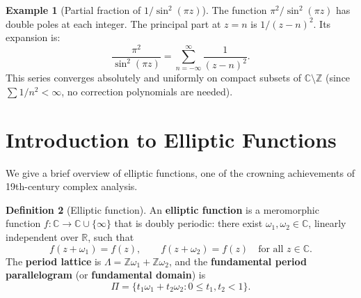 \documentclass[12pt,a4paper,openany]{book}
\theoremstyle{definition}
\newtheorem{definition}{Definition}[chapter]
\newtheorem{example}[definition]{Example}
\theoremstyle{plain}
\theoremstyle{remark}
\newcommand{\C}{\mathbb{C}}
\newcommand{\R}{\mathbb{R}}
\newcommand{\Z}{\mathbb{Z}}
\begin{document}
\begin{example}[Partial fraction of $1/\sin^2(\pi z)$]\label{ex:csc2-partial}
The function $\pi^2/\sin^2(\pi z)$ has double poles at each integer.
The principal part at $z = n$ is $1/(z-n)^2$. Its expansion is:
\[
  \frac{\pi^2}{\sin^2(\pi z)} = \sum_{n=-\infty}^{\infty} \frac{1}{(z-n)^2}.
\]
This series converges absolutely and uniformly on compact subsets
of $\C \setminus \Z$ (since $\sum 1/n^2 < \infty$, no correction
polynomials are needed).
\end{example}

\section{Introduction to Elliptic Functions}\label{sec:elliptic-intro}

We give a brief overview of elliptic functions, one of the
crowning achievements of 19th-century complex analysis.

\begin{definition}[Elliptic function]\label{def:elliptic-function}
An \textbf{elliptic function} is a meromorphic function
$f\colon \C \to \C \cup \{\infty\}$ that is doubly periodic:
there exist $\omega_1, \omega_2 \in \C$, linearly independent over $\R$, such that
\[
  f(z + \omega_1) = f(z), \qquad f(z + \omega_2) = f(z)
  \quad \text{for all } z \in \C.
\]
The \textbf{period lattice} is $\Lambda = \Z\omega_1 + \Z\omega_2$, and
the \textbf{fundamental period parallelogram} (or \textbf{fundamental domain})
is
\[
  \Pi = \{t_1 \omega_1 + t_2 \omega_2 : 0 \leq t_1, t_2 < 1\}.
\]
\end{definition}

\begin{center}
\label{fig:lattice}
\end{center}
\end{document}
